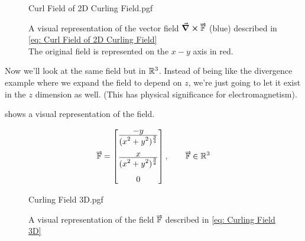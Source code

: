 \documentclass[main.tex]{subfiles}
\begin{document}
                    \begin{figure}[h]
                        \centering
                        \scalebox{0.8}
                        {
                            \begin{adjustbox}{clip,trim=150mm 70mm 130mm 60mm}
                                {{Curl Field of 2D Curling Field.pgf}}
                            \end{adjustbox}
                        }
                        \captionsetup{singlelinecheck=off}
                        \caption[.]{A visual representation of the vector field $\protect \curl{\vect{\mathbb{F}}}$ (blue) described in \eqref{eq: Curl Field of 2D Curling Field}\\The original field is represented on the $x-y$ axis in red.}
                        \label{fig: Curl Field of 2D Curling Field}
                    \end{figure}
                    \FloatBarrier
                    \vspace{2em}


                    \newpage
                    Now we'll look at the same field but in $\mathbb{R}^3$. Instead of being like the divergence example where we expand the field to depend on $z$, we're just going to let it exist in the $z$ dimension as well. (This has physical significance for electromagnetism).

                     shows a visual representation of the field.

                    \begin{equation}
                        \vect{\mathbb{F}} = \Matrix{\bfrac{-y}{(x^2 + y^2)^\frac{3}{4}}\\[1.5em] \bfrac{x}{(x^2 + y^2)^\frac{3}{4}}\\[1.5em] 0}, \hspace{2em} \vect{\mathbb{F}} \in \Reals^3
                        \label{eq: Curling Field 3D}
                    \end{equation}

                    \begin{figure}[h]
                        \centering
                        \scalebox{0.5}
                        {
                            \begin{adjustbox}{clip,trim=150mm 40mm 140mm 20mm}
                                {{Curling Field 3D.pgf}}
                            \end{adjustbox}
                        }
                        \caption{A visual representation of the field $\protect\vect{\mathbb{F}}$ described in \eqref{eq: Curling Field 3D}}
                        \label{fig: Curling Field 3D}
                    \end{figure}
                    \FloatBarrier
                    \vspace{2em}
\end{document}
